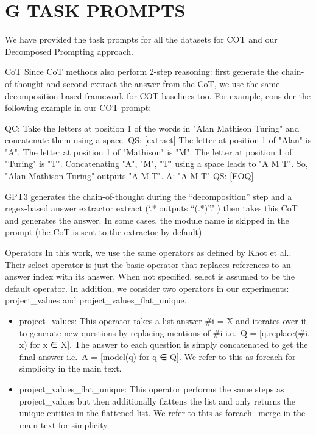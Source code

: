 \documentclass[
]{article}
\newenvironment{Shaded}{}{}
\newcommand{\NormalTok}[1]{#1}
\providecommand{\tightlist}{%
  \setlength{\itemsep}{0pt}\setlength{\parskip}{0pt}}
\begin{document}
\section{G TASK PROMPTS}\label{g-task-prompts}

We have provided the task prompts for all the datasets for COT and our
Decomposed Prompting approach.

CoT Since CoT methods also perform 2-step reasoning: first generate the
chain-of-thought and second extract the answer from the CoT, we use the
same decomposition-based framework for COT baselines too. For example,
consider the following example in our COT prompt:

\begin{Shaded}
\begin{Highlighting}[]
\NormalTok{QC: Take the letters at position 1 of the words in "Alan Mathison Turing" and concatenate them using a space.}
\NormalTok{QS: [extract] The letter at position 1 of "Alan" is "A". The letter at position 1 of "Mathison" is "M". The letter at position 1 of "Turing" is "T". Concatenating "A", "M", "T" using a space leads to "A M T". So, "Alan Mathison Turing" outputs "A M T".}
\NormalTok{A: "A M T"}
\NormalTok{QS: [EOQ] }
\end{Highlighting}
\end{Shaded}

GPT3 generates the chain-of-thought during the ``decomposition'' step
and a regex-based answer extractor extract (`.* outputs ``(.*)''.' )
then takes this CoT and generates the answer. In some cases, the module
name is skipped in the prompt (the CoT is sent to the extractor by
default).

Operators In this work, we use the same operators as defined by Khot et
al.. Their select operator is just the basic operator that replaces
references to an answer index with its answer. When not specified,
select is assumed to be the default operator. In addition, we consider
two operators in our experiments: project\_values and
project\_values\_flat\_unique.

\begin{itemize}
\tightlist
\item
  project\_values: This operator takes a list answer \#i = X and
  iterates over it to generate new questions by replacing mentions of
  \#i i.e.~Q = {[}q.replace(\#i, x) for x ∈ X{]}. The answer to each
  question is simply concatenated to get the final answer i.e.~A =
  {[}model(q) for q ∈ Q{]}. We refer to this as foreach for simplicity
  in the main text.\\
\item
  project\_values\_flat\_unique: This operator performs the same steps
  as project\_values but then additionally flattens the list and only
  returns the unique entities in the flattened list. We refer to this as
  foreach\_merge in the main text for simplicity.
\end{itemize}
\end{document}
